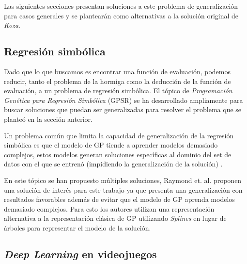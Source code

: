     Las siguientes secciones presentan soluciones a este problema de generalización para casos 
    generales y se plantearán como alternativas a la solución original de \textit{Koza}.

  \subsection{Regresión simbólica}
    \label{sec:regresion-simb}
    Dado que lo que buscamos es encontrar una función de evaluación, podemos reducir, tanto el 
    problema de la hormiga como la deducción de la función de evaluación, a un problema de regresión
    simbólica.
    El tópico de \textit{Programación Genética para Regresión Simbólica} (GPSR) se ha desarrollado 
    ampliamente para buscar soluciones que puedan ser generalizadas para resolver el problema que se
    planteó en la sección anterior.

    Un problema común que limita la capacidad de generalización de la regresión simbólica es que
    el modelo de GP tiende a aprender modelos demasiado complejos, estos modelos generan 
    soluciones específicas al dominio del set de datos con el que se entrenó (impidiendo la 
    generalización de la solución) \cite{raymondMultiobjectiveGeneticProgramming2021}.

    En este tópico se han propuesto múltiples soluciones, Raymond et. al. 
    \cite{raymondAdaptiveWeightedSplines2020,raymondMultiobjectiveGeneticProgramming2021} proponen
    una solución de interés para este trabajo ya que presenta una generalización con resultados
    favorables además de evitar que el modelo de GP aprenda modelos demasiado complejos.
    Para esto los autores utilizan una representación alternativa a la representación clásica de
    GP utilizando \textit{Splines} en lugar de árboles para representar el modelo de la solución.
    
  \subsection{\textit{Deep Learning} en videojuegos}
    
